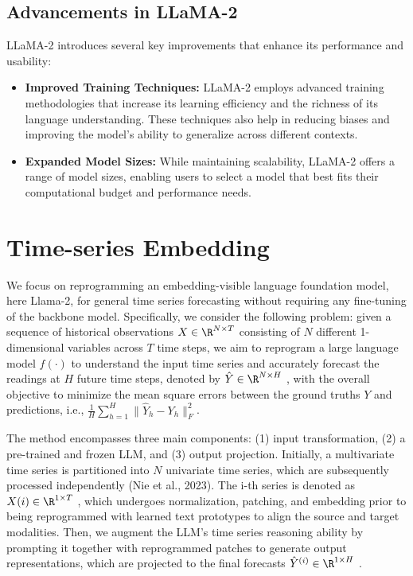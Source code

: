 \subsection{Advancements in LLaMA-2}

LLaMA-2 introduces several key improvements that enhance its performance and usability:

\begin{itemize}
	\item \textbf{Improved Training Techniques:} LLaMA-2 employs advanced training methodologies that increase its learning efficiency and the richness of its language understanding. These techniques also help in reducing biases and improving the model's ability to generalize across different contexts.

	\item \textbf{Expanded Model Sizes:} While maintaining scalability, LLaMA-2 offers a range of model sizes, enabling users to select a model that best fits their computational budget and performance needs.
\end{itemize}


\section{Time-series Embedding}
We focus on reprogramming an embedding-visible language foundation model, here Llama-2,
for general time series forecasting without requiring any fine-tuning of the backbone model. Specifically, we consider the following problem: given a sequence of historical observations \(X \in \R^{N\times T}\)
consisting of \(N\) different 1-dimensional variables across \(T\) time steps, we aim to reprogram a large
language model \(f(\cdot)\) to understand the input time series and accurately forecast the readings at \(H\) future time steps, denoted by \(\hat{Y} \in \R^{N\times H}\) , with the overall objective to minimize the mean square errors between the ground truths \(Y\) and predictions, i.e., \(\frac1H \sum_{h=1}^H \| \hat{Y}_h - Y_h \|_F^2 \).

The method encompasses three main components: (1) input transformation, (2) a pre-trained and
frozen LLM, and (3) output projection. Initially, a multivariate time series is partitioned into \(N\) univariate time series, which are subsequently processed independently (Nie et al., 2023).
The i-th series is denoted as \(X(i) \in \R^{1\times T}\) , which undergoes normalization, patching, and embedding prior to being reprogrammed with learned text prototypes to align the source and target modalities.
Then, we augment the LLM’s time series reasoning ability by prompting it together with reprogrammed patches to generate output representations, which are projected to the final forecasts \(\hat{Y}^{(i)} \in \R^{1\times H}\) .

